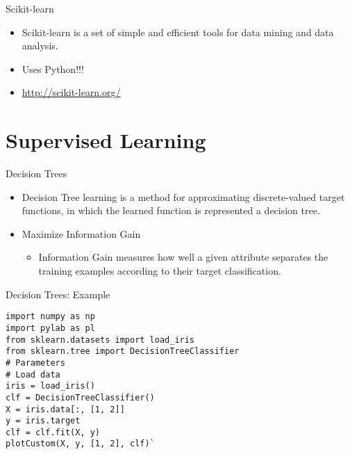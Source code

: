 \begin{frame}{Scikit-learn}

\begin{itemize}
\itemsep1pt\parskip0pt
\item
  Scikit-learn is a set of simple and efficient tools for data mining
  and data analysis.
\item
  Uses Python!!!
\item
  \url{http://scikit-learn.org/}
\end{itemize}

\end{frame}

\section{Supervised Learning}\label{supervised-learning}

\begin{frame}{Decision Trees}

\begin{itemize}
\itemsep1pt\parskip0pt
\item
  Decision Tree learning is a method for approximating discrete-valued
  target functions, in which the learned function is represented a
  decision tree.
\item
  Maximize Information Gain

  \begin{itemize}
  \itemsep1pt\parskip0pt
  \item
    Information Gain measures how well a given attribute separates the
    training examples according to their target classification.
  \end{itemize}
\end{itemize}

\end{frame}

\begin{frame}[fragile]{Decision Trees: Example}

\begin{verbatim}
import numpy as np
import pylab as pl
from sklearn.datasets import load_iris
from sklearn.tree import DecisionTreeClassifier
# Parameters
# Load data
iris = load_iris()
clf = DecisionTreeClassifier()
X = iris.data[:, [1, 2]]
y = iris.target
clf = clf.fit(X, y)
plotCustom(X, y, [1, 2], clf)`
\end{verbatim}

\end{frame}

